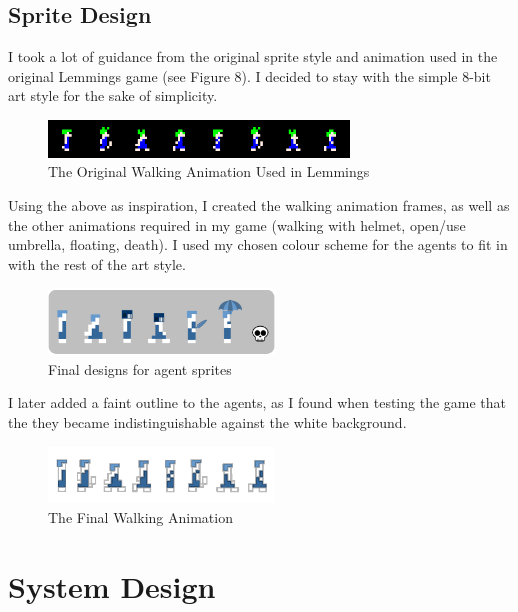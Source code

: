 \documentclass[a4paper,oneside]{report}
\begin{document}
\section{Sprite Design}
		
I took a lot of guidance from the original sprite style and animation used in the original Lemmings game (see Figure 8). I decided to stay with the simple 8-bit art style for the sake of simplicity.
	
\begin{figure}[h!]
  \centering
    \includegraphics[width=80mm]{sources/images/lemmings-walker-sprites}
    \caption{The Original Walking Animation Used in Lemmings}
\end{figure}
		
Using the above as inspiration, I created the walking animation frames, as well as the other animations required in my game (walking with helmet, open/use umbrella, floating, death). I used my chosen colour scheme for the agents to fit in with the rest of the art style.
		
\begin{figure}[h!]
  \centering
    \includegraphics[width=60mm]{sources/images/Final}
    \caption{Final designs for agent sprites}
\end{figure}

I later added a faint outline to the agents, as I found when testing the game that the they became indistinguishable against the white background.
	
\begin{figure}[h!]
  \centering
    \includegraphics[width=60mm]{sources/images/Lemming_walk_anim}
    \caption{The Final Walking Animation}
\end{figure}
	
\chapter{System Design}
\end{document}
